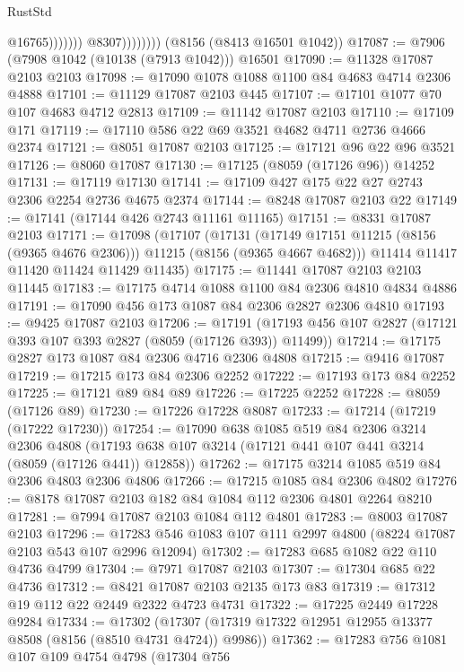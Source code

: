 \begin{lexlean}{RustStd}
\begin{coremodule}
{\begin{coremodule}
{{{{{{{{{{{{{{{{{{{{{{{{{{{{{{{{{{                                  @16765)))))))
                    @8307))))))))
    (@8156 (@8413 @16501 @1042))
@17087 := @7906 (@7908 @1042 (@10138 (@7913 @1042))) @16501
@17090 := @11328 @17087 @2103 @2103
@17098 := @17090 @1078 @1088 @1100 @84 @4683 @4714 @2306 @4888
@17101 := @11129 @17087 @2103 @445
@17107 := @17101 @1077 @70 @107 @4683 @4712 @2813
@17109 := @11142 @17087 @2103
@17110 := @17109 @171
@17119 := @17110 @586 @22 @69 @3521 @4682 @4711 @2736 @4666 @2374
@17121 := @8051 @17087 @2103
@17125 := @17121 @96 @22 @96 @3521
@17126 := @8060 @17087
@17130 := @17125 (@8059 (@17126 @96)) @14252
@17131 := @17119 @17130
@17141 := @17109 @427 @175 @22 @27 @2743 @2306 @2254 @2736 @4675 @2374
@17144 := @8248 @17087 @2103 @22
@17149 := @17141 (@17144 @426 @2743 @11161 @11165)
@17151 := @8331 @17087 @2103
@17171 := @17098
    (@17107
      (@17131 (@17149 @17151 @11215 (@8156 (@9365 @4676 @2306))) @11215 (@8156 (@9365 @4667 @4682)))
      @11414
      @11417
      @11420
      @11424
      @11429
      @11435)
@17175 := @11441 @17087 @2103 @2103 @11445
@17183 := @17175 @4714 @1088 @1100 @84 @2306 @4810 @4834 @4886
@17191 := @17090 @456 @173 @1087 @84 @2306 @2827 @2306 @4810
@17193 := @9425 @17087 @2103
@17206 := @17191 (@17193 @456 @107 @2827 (@17121 @393 @107 @393 @2827 (@8059 (@17126 @393)) @11499))
@17214 := @17175 @2827 @173 @1087 @84 @2306 @4716 @2306 @4808
@17215 := @9416 @17087
@17219 := @17215 @173 @84 @2306 @2252
@17222 := @17193 @173 @84 @2252
@17225 := @17121 @89 @84 @89
@17226 := @17225 @2252
@17228 := @8059 (@17126 @89)
@17230 := @17226 @17228 @8087
@17233 := @17214 (@17219 (@17222 @17230))
@17254 := @17090
    @638
    @1085
    @519
    @84
    @2306
    @3214
    @2306
    @4808
    (@17193 @638 @107 @3214 (@17121 @441 @107 @441 @3214 (@8059 (@17126 @441)) @12858))
@17262 := @17175 @3214 @1085 @519 @84 @2306 @4803 @2306 @4806
@17266 := @17215 @1085 @84 @2306 @4802
@17276 := @8178 @17087 @2103 @182 @84 @1084 @112 @2306 @4801 @2264 @8210
@17281 := @7994 @17087 @2103 @1084 @112 @4801
@17283 := @8003 @17087 @2103
@17296 := @17283 @546 @1083 @107 @111 @2997 @4800 (@8224 @17087 @2103 @543 @107 @2996 @12094)
@17302 := @17283 @685 @1082 @22 @110 @4736 @4799
@17304 := @7971 @17087 @2103
@17307 := @17304 @685 @22 @4736
@17312 := @8421 @17087 @2103 @2135 @173 @83
@17319 := @17312 @19 @112 @22 @2449 @2322 @4723 @4731
@17322 := @17225 @2449 @17228 @9284
@17334 := @17302
    (@17307 (@17319 @17322 @12951 @12955 @13377 @8508 (@8156 (@8510 @4731 @4724)) @9986))
@17362 := @17283
    @756
    @1081
    @107
    @109
    @4754
    @4798
    (@17304
      @756
}}}}}}}}}}}}}}}}}}}}}}}}}}}}}}}}}}
\end{coremodule}}
\end{coremodule}
\end{lexlean}
